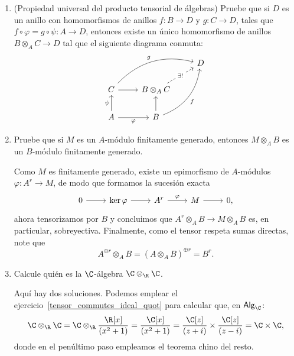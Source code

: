 \documentclass[11pt, reqno]{amsart}
\begin{document}
\begin{enumerate}
\begin{enumerate}
			\item\lookright (Propiedad universal del producto tensorial de álgebras)
				Pruebe que si $D$ es un anillo con homomorfismos de anillos $f\colon B \to D$ y $g\colon C \to D$,
				tales que $f\circ\varphi = g\circ\psi \colon A \to D$, entonces existe un único
				homomorfismo de anillos $B\otimes_A C \to D$ tal que el siguiente diagrama conmuta:
				\[\begin{tikzcd}
					&& D \\
					C & {B\otimes_A C} \\
					A & B
					\arrow["g", bend left, from=2-1, to=1-3]
					\arrow[from=2-1, to=2-2]
					\arrow["{\exists!}"{description}, dashed, from=2-2, to=1-3]
					\arrow["\psi", from=3-1, to=2-1]
					\arrow["\varphi"', from=3-1, to=3-2]
					\arrow["f"', bend right, from=3-2, to=1-3]
					\arrow[from=3-2, to=2-2]
				\end{tikzcd}\]

			\item Pruebe que si $M$ es un $A$-módulo finitamente generado, entonces $M\otimes_A B$ es un
				$B$-módulo finitamente generado.

				\begin{sol}
					Como $M$ es finitamente generado, existe un epimorfismo de $A$-módulos
					$\varphi\colon A^r \to M$, de modo que formamos la sucesión exacta
					\[\begin{tikzcd}
						0 \rar & \ker\varphi \rar & A^r \rar["\varphi"] & M \rar & 0,
					\end{tikzcd}\]
					ahora tensorizamos por $B$ y concluimos que $A^r\otimes_A B \to M\otimes_A B$
					es, en particular, sobreyectiva.
					Finalmente, como el tensor respeta sumas directas, note que
					\[
						A^{\oplus r}\otimes_A B = (A\otimes_A B)^{\oplus r} = B^r.
					\]
				\end{sol}

			\item Calcule quién es la $\C$-álgebra $\C \otimes_\R \C$.

				\begin{sol}
					Aquí hay dos soluciones.
					Podemos emplear el ejercicio~\ref{tensor_commutes_ideal_quot} para calcular que,
					en $\mathsf{Alg}_\C$:
					\[
						\C \otimes_\R \C = \C\otimes_\R \frac{\R[x]}{(x^2 + 1)} =
						\frac{\C[x]}{(x^2 + 1)} = \frac{\C[z]}{(z+i)} \times \frac{\C[z]}{(z-i)}
						= \C\times\C,
					\]
					donde en el penúltimo paso empleamos el teorema chino del resto.


\end{sol}
\end{enumerate}
\end{enumerate}
\end{document}
